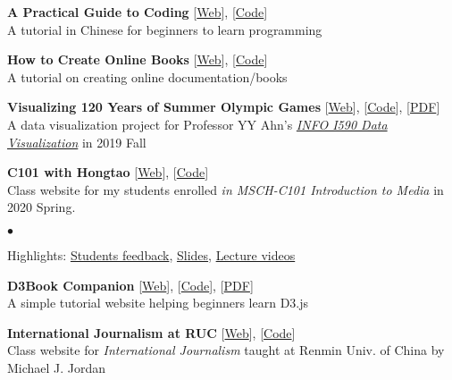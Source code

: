 \documentclass[margin,line, 10pt]{res}
\newenvironment{list2}{
  \begin{list}{$\bullet$}{%
      \setlength{\itemsep}{0in}
      \setlength{\parsep}{0in} \setlength{\parskip}{0in}
      \setlength{\topsep}{0in} \setlength{\partopsep}{0in} 
      \setlength{\leftmargin}{0.2in}}}{\end{list}}
\begin{document}
\begin{resume}
{\bf A Practical Guide to Coding}{\hspace{2em} [\href{https://intro2code.hongtaoh.com/}{Web}], [\href{https://github.com/hongtaoh/intro2code}{Code}]}\\
A tutorial in Chinese for beginners to learn programming

{\bf How to Create Online Books}{\hspace{2em} [\href{https://onlinebook.hongtaoh.com/}{Web}], [\href{https://github.com/hongtaoh/onlinebook}{Code}]}\\
A tutorial on creating online documentation/books

{\bf Visualizing 120 Years of Summer Olympic Games}{\hspace{2em} [\href{https://olymvis.hongtaoh.com/}{Web}], [\href{https://github.com/hongtaoh/olymvis-data}{Code}],
[\href{https://raw.githubusercontent.com/hongtaoh/olymvis/master/static/tex-pdf/fang_hao_olymvis.pdf}{PDF}]} \\
A data visualization project for Professor YY Ahn's \href{http://yyahn.com/dviz-course/}{\emph{INFO I590 Data Visualization}} in 2019 Fall

{\textbf {C101 with Hongtao}}{ \hspace{2em} [\href{https://c101.hongtaoh.com/}{Web}], [\href{https://github.com/hongtaoh/c101}{Code}]} \\
Class website for my students enrolled \textit{in MSCH-C101 Introduction to Media} in 2020 Spring.

\vspace*{.05in}  
\begin{list2}
\item Highlights: \href{https://c101.hongtaoh.com/feedback/}{Students feedback}, \href{https://c101.hongtaoh.com/slides/}{Slides}, \href{https://c101.hongtaoh.com/videos/}{Lecture videos}
\end{list2}

{\bf D3Book Companion}{\hspace{2em} [\href{https://d3book.hongtaoh.com/}{Web}], [\href{https://github.com/hongtaoh/d3book}{Code}]},
[\href{https://d3book.hongtaoh.com/d3book.pdf}{PDF}]\\
A simple tutorial website helping beginners learn D3.js

{\bf International Journalism at RUC}{\hspace{2em} [\href{https://rucer.netlify.app/}{Web}], [\href{https://github.com/hongtaoh/guoxinban}{Code}]} \\
Class website for \textit {International Journalism} taught at Renmin Univ. of China by Michael J. Jordan


\end{resume}
\end{document}
